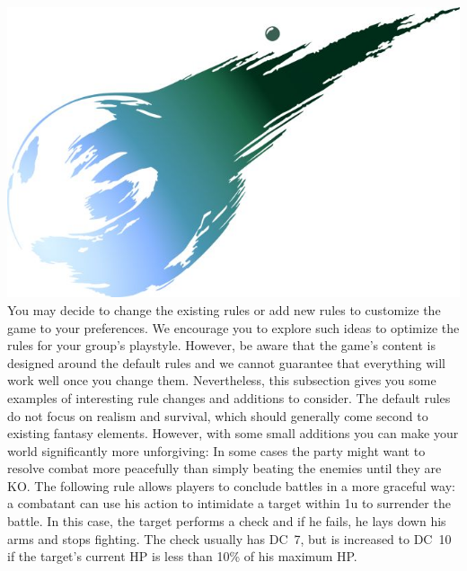 %
%
\vfill
%
\includegraphics[width=\columnwidth]{./art/images/ff7.jpg}
%
\vfill
%
You may decide to change the existing rules or add new rules to customize the game to your preferences.
We encourage you to explore such ideas to optimize the rules for your group's playstyle.
However, be aware that the game's content is designed around the default rules and we cannot guarantee that everything will work well once you change them.
Nevertheless, this subsection gives you some examples of interesting rule changes and additions to consider.
%
\vfill
%
The default rules do not focus on realism and survival, which should generally come second to existing fantasy elements.
However, with some small additions you can make your world significantly more unforgiving:\ofrow
{}
%
\vfill
%
In some cases the party might want to resolve combat more peacefully than simply beating the enemies until they are KO.
The following rule allows players to conclude battles in a more graceful way:
a combatant can use his action to intimidate a target within 1u to surrender the battle.
In this case, the target performs a check and if he fails, he lays down his arms and stops fighting. 
The check usually has DC~7, but is increased to DC~10 if the target's current HP is less than 10\% of his maximum HP.
